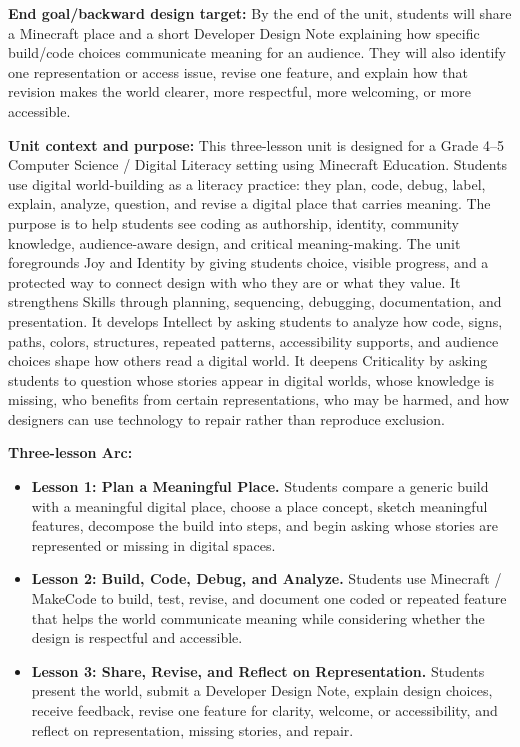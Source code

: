 \textbf{End goal/backward design target:} \textcolor{LessonTwoAccent}{By the end of the unit, students will share a Minecraft place and a short Developer Design Note explaining how specific build/code choices communicate meaning for an audience. They will also identify one representation or access issue, revise one feature, and explain how that revision makes the world clearer, more respectful, more welcoming, or more accessible.}

\textbf{Unit context and purpose:} This three-lesson unit is designed for a Grade 4--5 Computer Science / Digital Literacy setting using Minecraft Education. Students use digital world-building as a literacy practice: they plan, code, debug, label, explain, analyze, question, and revise a digital place that carries meaning. The purpose is to help students see coding as authorship, identity, community knowledge, audience-aware design, and critical meaning-making. The unit foregrounds Joy and Identity by giving students choice, visible progress, and a protected way to connect design with who they are or what they value. It strengthens Skills through planning, sequencing, debugging, documentation, and presentation. It develops Intellect by asking students to analyze how code, signs, paths, colors, structures, repeated patterns, accessibility supports, and audience choices shape how others read a digital world. \textcolor{LessonTwoAccent}{It deepens Criticality by asking students to question whose stories appear in digital worlds, whose knowledge is missing, who benefits from certain representations, who may be harmed, and how designers can use technology to repair rather than reproduce exclusion.}

\textbf{Three-lesson Arc:}
\begin{itemize}[leftmargin=*]
    \item \textcolor{LessonOneAccent}{\textbf{Lesson 1: Plan a Meaningful Place.}} Students compare a generic build with a meaningful digital place, choose a place concept, sketch meaningful features, decompose the build into steps, and begin asking whose stories are represented or missing in digital spaces.
    \item \textcolor{LessonTwoAccent}{\textbf{Lesson 2: Build, Code, Debug, and Analyze.}} Students use Minecraft / MakeCode to build, test, revise, and document one coded or repeated feature that helps the world communicate meaning while considering whether the design is respectful and accessible.
    \item \textcolor{LessonThreeAccent}{\textbf{Lesson 3: Share, Revise, and Reflect on Representation.}} Students present the world, submit a Developer Design Note, explain design choices, receive feedback, revise one feature for clarity, welcome, or accessibility, and reflect on representation, missing stories, and repair.
\end{itemize}

